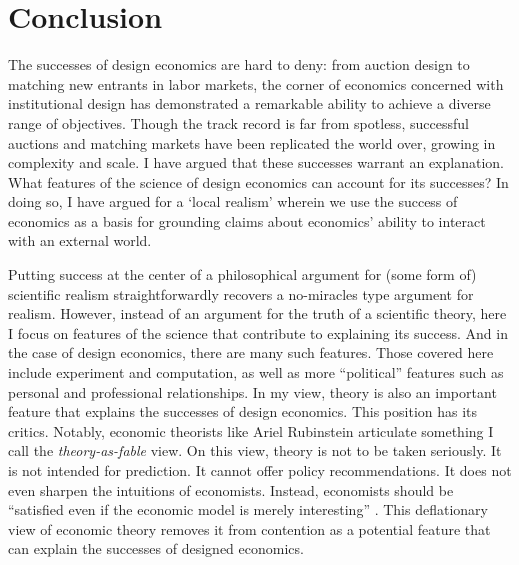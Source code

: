 \section{Conclusion}\label{fable_sec_conc}

The successes of design economics are hard to deny: from auction design to matching new entrants in labor markets, the corner of economics concerned with institutional design has demonstrated a remarkable ability to achieve a diverse range of objectives. Though the track record is far from spotless, successful auctions and matching markets have been replicated the world over, growing in complexity and scale. I have argued that these successes warrant an explanation. What features of the science of design economics can account for its successes? In doing so, I have argued for a `local realism' wherein we use the success of economics as a basis for grounding claims about economics' ability to interact with an external world.

Putting success at the center of a philosophical argument for (some form of) scientific realism straightforwardly recovers a no-miracles type argument for realism. However, instead of an argument for the truth of a scientific theory, here I focus on features of the science that contribute to explaining its success. And in the case of design economics, there are many such features. Those covered here include experiment and computation, as well as more ``political'' \autocite[1345]{roth2002} features such as personal and professional relationships. In my view, theory is also an important feature that explains the successes of design economics. This position has its critics. Notably, economic theorists like Ariel Rubinstein \autocite*{rubinstein2006,rubinstein2012} articulate something I call the \textit{theory-as-fable} view. On this view, theory is not to be taken seriously. It is not intended for prediction. It cannot offer policy recommendations. It does not even sharpen the intuitions of economists. Instead, economists should be ``satisfied even if the economic model is merely interesting'' \autocite[36]{rubinstein1982}. This deflationary view of economic theory removes it from contention as a potential feature that can explain the successes of designed economics.

